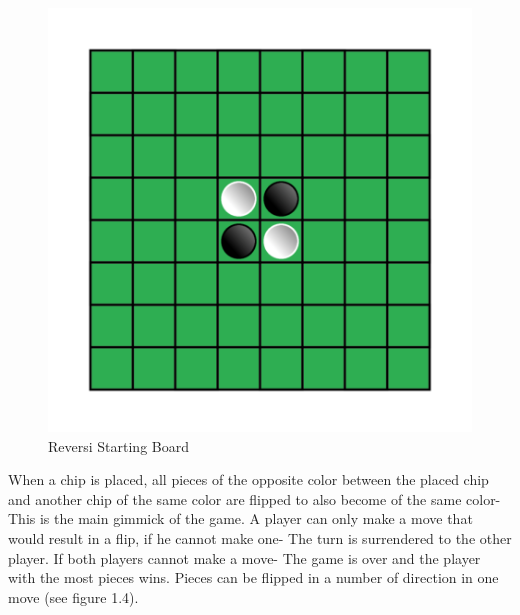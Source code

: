 \documentclass[12pt,a4paper, openany]{report}
\begin{document}
\begin{figure}[ht]
\begin{center}
\includegraphics[scale=0.25]{reversi}
\caption{Reversi Starting Board}
\end{center}
\end{figure}

When a chip is placed, all pieces of the opposite color between the placed chip and another chip of the same color are flipped to also become of the same color- This is the main gimmick of the game. A player can only make a move that would result in a flip, if he cannot make one- The turn is surrendered to the other player. If both players cannot make a move- The game is over and the player with the most pieces wins. Pieces can be flipped in a number of direction in one move (see figure 1.4).
\end{document}
